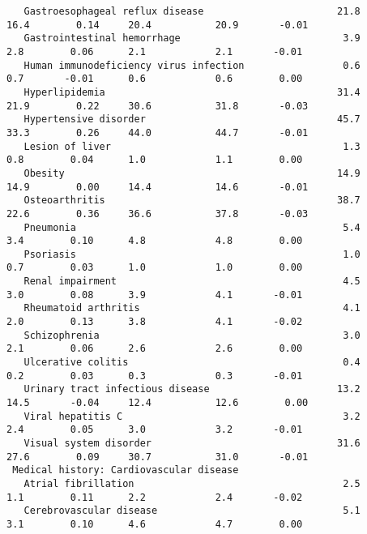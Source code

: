 \documentclass[]{article}
\begin{document}
\begin{verbatim}
   Gastroesophageal reflux disease                       21.8            16.4        0.14     20.4           20.9       -0.01    
   Gastrointestinal hemorrhage                            3.9             2.8        0.06      2.1            2.1       -0.01    
   Human immunodeficiency virus infection                 0.6             0.7       -0.01      0.6            0.6        0.00    
   Hyperlipidemia                                        31.4            21.9        0.22     30.6           31.8       -0.03    
   Hypertensive disorder                                 45.7            33.3        0.26     44.0           44.7       -0.01    
   Lesion of liver                                        1.3             0.8        0.04      1.0            1.1        0.00    
   Obesity                                               14.9            14.9        0.00     14.4           14.6       -0.01    
   Osteoarthritis                                        38.7            22.6        0.36     36.6           37.8       -0.03    
   Pneumonia                                              5.4             3.4        0.10      4.8            4.8        0.00    
   Psoriasis                                              1.0             0.7        0.03      1.0            1.0        0.00    
   Renal impairment                                       4.5             3.0        0.08      3.9            4.1       -0.01    
   Rheumatoid arthritis                                   4.1             2.0        0.13      3.8            4.1       -0.02    
   Schizophrenia                                          3.0             2.1        0.06      2.6            2.6        0.00    
   Ulcerative colitis                                     0.4             0.2        0.03      0.3            0.3       -0.01    
   Urinary tract infectious disease                      13.2            14.5       -0.04     12.4           12.6        0.00    
   Viral hepatitis C                                      3.2             2.4        0.05      3.0            3.2       -0.01    
   Visual system disorder                                31.6            27.6        0.09     30.7           31.0       -0.01    
 Medical history: Cardiovascular disease                                                                                         
   Atrial fibrillation                                    2.5             1.1        0.11      2.2            2.4       -0.02    
   Cerebrovascular disease                                5.1             3.1        0.10      4.6            4.7        0.00    

\end{verbatim}
\end{document}
